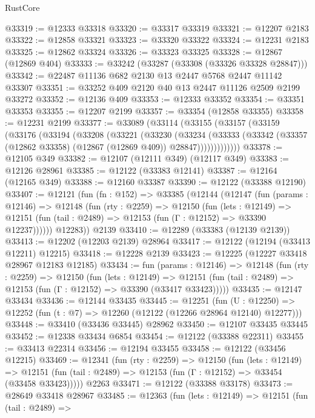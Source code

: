 \begin{lexlean}{RustCore}
\begin{coremodule}
@33319 := @12333 @33318
@33320 := @33317 @33319
@33321 := @12207 @2183
@33322 := @12858 @33321
@33323 := @33320 @33322
@33324 := @12231 @2183
@33325 := @12862 @33324
@33326 := @33323 @33325
@33328 := @12867 (@12869 @404)
@33333 := @33242 (@33287 (@33308 (@33326 @33328 @28847)))
@33342 := @22487 @11136 @682 @2130 @13 @2447 @5768 @2447 @11142 @33307
@33351 := @33252 @409 @2120 @40 @13 @2447 @11126 @2509 @2199 @33272
@33352 := @12136 @409
@33353 := @12333 @33352
@33354 := @33351 @33353
@33355 := @12207 @2199
@33357 := @33354 (@12858 @33355)
@33358 := @12231 @2199
@33377 := @33089
    (@33114
      (@33155
        (@33157
          (@33159
            (@33176
              (@33194
                (@33208
                  (@33221
                    (@33230
                      (@33234
                        (@33333
                          (@33342 (@33357 (@12862 @33358) (@12867 (@12869 @409)) @28847)))))))))))))
@33378 := @12105 @349
@33382 := @12107 (@12111 @349) (@12117 @349)
@33383 := @12126 @28961
@33385 := @12122 (@33383 @12141)
@33387 := @12164 (@12165 @349)
@33388 := @12160 @33387
@33390 := @12122 (@33388 @12190)
@33407 := @12121
    (fun (fn : @152) =>
    @33385
      (@12144
        (@12147
          (fun (params : @12146) =>
          @12148
            (fun (rty : @2259) =>
            @12150
              (fun (lets : @12149) =>
              @12151 (fun (tail : @2489) => @12153 (fun (Γ : @12152) => @33390 @12237))))))
        @12283))
    @2139
@33410 := @12289 (@33383 (@12139 @2139))
@33413 := @12202 (@12203 @2139) @28964
@33417 := @12122 (@12194 (@33413 @12211) @12215)
@33418 := @12228 @2139
@33423 := @12225 (@12227 @33418 @28967 @12183 @12185)
@33434 := fun (params : @12146) =>
  @12148
    (fun (rty : @2259) =>
    @12150
      (fun (lets : @12149) =>
      @12151 (fun (tail : @2489) => @12153 (fun (Γ : @12152) => @33390 (@33417 @33423)))))
@33435 := @12147 @33434
@33436 := @12144 @33435
@33445 := @12251
    (fun (U : @12250) => @12252 (fun (t : @7) => @12260 (@12122 (@12266 @28964 @12140) @12277)))
@33448 := @33410 (@33436 @33445) @28962
@33450 := @12107 @33435 @33445
@33452 := @12338 @33434 @6854
@33454 := @12122 (@33388 @22311)
@33455 := @33413 @22314
@33456 := @12194 @33455
@33458 := @12122 (@33456 @12215)
@33469 := @12341
    (fun (rty : @2259) =>
    @12150
      (fun (lets : @12149) =>
      @12151 (fun (tail : @2489) => @12153 (fun (Γ : @12152) => @33454 (@33458 @33423)))))
    @2263
@33471 := @12122 (@33388 @33178)
@33473 := @28649 @33418 @28967
@33485 := @12363
    (fun (lets : @12149) =>
    @12151
      (fun (tail : @2489) =>

\end{coremodule}
\end{lexlean}
